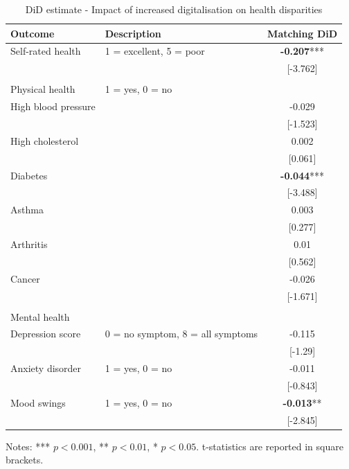 \begin{table}[h!]
    \centering
    \caption{DiD estimate - Impact of increased digitalisation on health disparities}
    \label{tab:did}
    \begin{threeparttable}
        \begin{tabular}{llc}
            \toprule
            Outcome & Description & Matching DiD \\
            \midrule
            Self-rated health & 1 = excellent, 5 = poor & \textbf{-0.207}*** \\
            &  & [-3.762] \\
            & & \\
            Physical health & 1 = yes, 0 = no & \\
            High blood pressure &  & -0.029 \\
            &  & [-1.523] \\
            High cholesterol &  & 0.002 \\
            &  & [0.061] \\
            Diabetes &  & \textbf{-0.044}*** \\
            &  & [-3.488] \\
            Asthma &  & 0.003 \\
            &  & [0.277] \\
            Arthritis &  & 0.01 \\
            &  & [0.562] \\
            Cancer &  & -0.026 \\
            &  & [-1.671] \\
            & & \\
            Mental health & & \\
            Depression score & 0 = no symptom, 8 = all symptoms & -0.115 \\
            &  & [-1.29] \\
            Anxiety disorder & 1 = yes, 0 = no & -0.011 \\
            &  & [-0.843] \\
            Mood swings & 1 = yes, 0 = no & \textbf{-0.013}** \\
            &  & [-2.845] \\
            \bottomrule
        \end{tabular}
        \begin{tablenotes}
            \footnotesize
            \item Notes: *** $p < 0.001$, ** $p < 0.01$, * $p < 0.05$. t-statistics are reported in square brackets.
        \end{tablenotes}
    \end{threeparttable}
\end{table}


